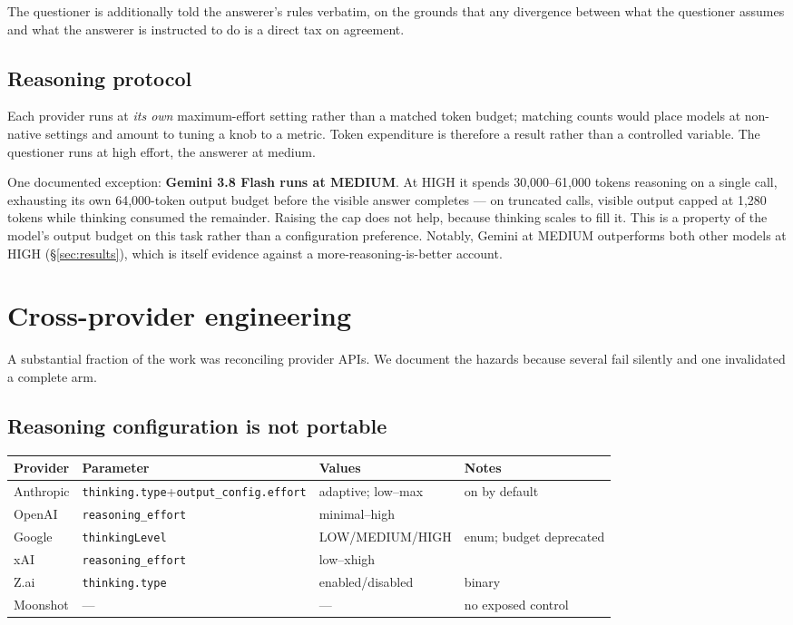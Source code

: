 \documentclass[11pt]{article}
\begin{document}
The questioner is additionally told the answerer's rules verbatim, on the
grounds that any divergence between what the questioner assumes and what the
answerer is instructed to do is a direct tax on agreement.

\subsection{Reasoning protocol}
\label{sec:reasoning}

Each provider runs at \emph{its own} maximum-effort setting rather than a
matched token budget; matching counts would place models at non-native settings
and amount to tuning a knob to a metric. Token expenditure is therefore a result
rather than a controlled variable. The questioner runs at high effort, the
answerer at medium.

One documented exception: \textbf{Gemini 3.8 Flash runs at MEDIUM}. At HIGH it
spends 30{,}000--61{,}000 tokens reasoning on a single call, exhausting its own
64{,}000-token output budget before the visible answer completes --- on
truncated calls, visible output capped at 1{,}280 tokens while thinking consumed
the remainder. Raising the cap does not help, because thinking scales to fill
it. This is a property of the model's output budget on this task rather than a
configuration preference. Notably, Gemini at MEDIUM outperforms both other
models at HIGH (\S\ref{sec:results}), which is itself evidence against a
more-reasoning-is-better account.

\section{Cross-provider engineering}
\label{sec:eng}

A substantial fraction of the work was reconciling provider APIs. We document
the hazards because several fail silently and one invalidated a complete arm.

\subsection{Reasoning configuration is not portable}

\begin{table}[h]
\centering\small
\begin{tabular}{llll}
\toprule
Provider & Parameter & Values & Notes \\
\midrule
Anthropic & \texttt{thinking.type}+\texttt{output\_config.effort}
  & adaptive; low--max & on by default \\
OpenAI & \texttt{reasoning\_effort} & minimal--high & \\
Google & \texttt{thinkingLevel} & LOW/MEDIUM/HIGH & enum; budget deprecated \\
xAI & \texttt{reasoning\_effort} & low--xhigh & \\
Z.ai & \texttt{thinking.type} & enabled/disabled & binary \\
Moonshot & --- & --- & no exposed control \\
\bottomrule
\end{tabular}
\end{table}
\end{document}
